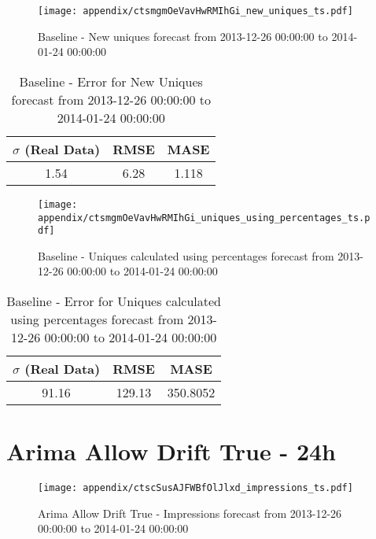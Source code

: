 \begin{figure}[H] \begin{center} \leavevmode
\texttt{[image: appendix/ctsmgmOeVavHwRMIhGi\_new\_uniques\_ts.pdf]} \caption{
Baseline - New uniques forecast from 2013-12-26 00:00:00 to 2014-01-24 00:00:00} \label{fig:appendix/ctsmgmOeVavHwRMIhGi_new_uniques_ts.pdf} \end{center}
\end{figure}

\begin{table}[H]
\centering
\footnotesize
\begin{tabular}{ccc}
$\sigma$ (Real Data) & RMSE & MASE   \\ \hline
1.54 & 6.28 & 1.118 \\
\end{tabular}

\vspace{0.5cm}

\caption{
Baseline - Error for New Uniques forecast from 2013-12-26 00:00:00 to 2014-01-24 00:00:00}
\end{table}

\begin{figure}[H] \begin{center} \leavevmode
\texttt{[image: appendix/ctsmgmOeVavHwRMIhGi\_uniques\_using\_percentages\_ts.pdf]} \caption{
Baseline - Uniques calculated using percentages forecast from 2013-12-26 00:00:00 to 2014-01-24 00:00:00} \label{fig:appendix/ctsmgmOeVavHwRMIhGi_uniques_using_percentages_ts.pdf} \end{center}
\end{figure}

\begin{table}[H]
\centering
\footnotesize
\begin{tabular}{ccc}
$\sigma$ (Real Data) & RMSE & MASE   \\ \hline
91.16 & 129.13 & 350.8052 \\
\end{tabular}

\vspace{0.5cm}

\caption{
Baseline - Error for Uniques calculated using percentages forecast from 2013-12-26 00:00:00 to 2014-01-24 00:00:00}
\end{table}

\section{Arima Allow Drift True - 24h}
\begin{figure}[H] \begin{center} \leavevmode
\texttt{[image: appendix/ctscSusAJFWBfOlJlxd\_impressions\_ts.pdf]} \caption{
Arima Allow Drift True - Impressions forecast from 2013-12-26 00:00:00 to 2014-01-24 00:00:00} \label{fig:appendix/ctscSusAJFWBfOlJlxd_impressions_ts.pdf} \end{center}
\end{figure}

